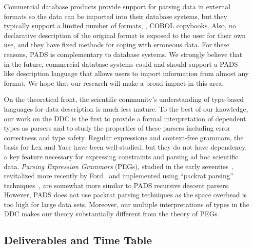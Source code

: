 \documentclass[10pt]{article}
\begin{document}
Commercial database products provide support for
parsing data in external formats so the data can be imported into
their database systems, but they typically support a limited number of
formats, \eg{}, COBOL copybooks.  Also, no declarative description of the
original format is exposed to the user for their own use, and they
have fixed methods for coping with erroneous data.  For these reasons,
PADS is complementary to database systems.  We strongly believe that
in the future, commercial database systems could and should support a 
PADS-like description language that allows users to import information from
almost any format.  We hope that our research will make a broad
impact in this area.

On the theoretical front, the scientific community's understanding of
type-based languages for data description is much less mature.  To the
best of our knowledge, our work on the DDC is the first to provide a
formal interpretation of dependent types as parsers and to study the
properties of these parsers including error correctness and type
safety.  Regular expressions and context-free grammars, the basis for
Lex and Yacc have been well-studied, but they do not have dependency,
a key feature necessary for expressing constraints and parsing ad hoc
scientific data.  {\em Parsing Expression Grammars} (PEGs), studied in
the early seventies~\cite{birman+:parsing}, revitalized more recently
by Ford~\cite{ford:pegs} and implemented using ``packrat parsing''
techniques~\cite{ford:packrat,grimm:packrat}, are somewhat more
similar to PADS recursive descent parsers. However, PADS does not use
packrat parsing techniques as the space overhead is too high for large
data sets.  Moreover, our multiple interpretations of types
in the DDC makes our theory substantially different from the theory of
PEGs.

\subsection{Deliverables and Time Table}
\end{document}

